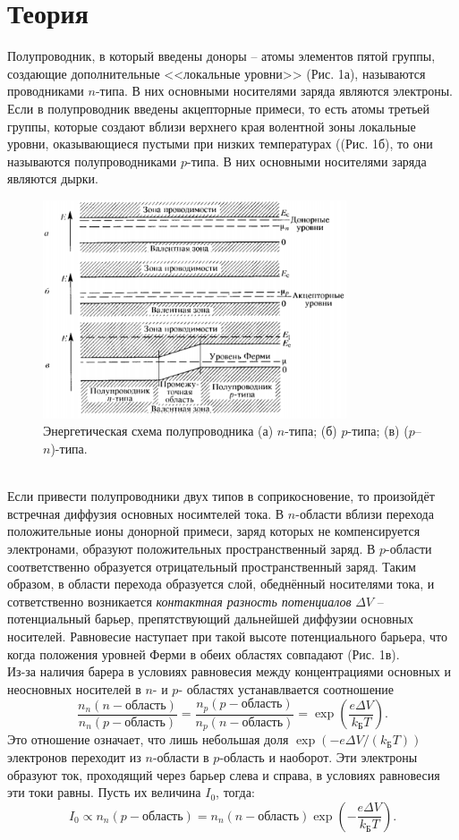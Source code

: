 \documentclass[a4paper,12pt]{article}
\theoremstyle{definition}
\begin{document}
\section*{Теория}
Полупроводник, в который введены доноры -- атомы элементов пятой группы, создающие дополнительные <<локальные уровни>> (Рис. 1а), называются проводниками $n$-типа. В них основными носителями заряда являются электроны. Если в полупроводник введены акцепторные примеси, то есть атомы третьей группы, которые создают вблизи верхнего края волентной зоны локальные уровни, оказывающиеся пустыми при низких температурах ((Рис. 1б), то они называются полупроводниками $p$-типа. В них основными носителями заряда являются дырки.
\begin{figure}[h]
\includegraphics[width = 0.8\textwidth]{1.png}
\centering
\caption{Энергетическая схема полупроводника (а) $n$-типа; (б) $p$-типа; (в) ($p$--$n$)-типа.}
\end{figure}\\
Если привести полупроводники двух типов в соприкосновение, то произойдёт встречная диффузия основных носимтелей тока. В $n$-области вблизи перехода положительные ионы донорной примеси, заряд которых не компенсируется электронами, образуют положительных пространственный заряд. В $p$-области соответственно образуется отрицательный пространственный заряд. Таким образом, в области перехода образуется слой, обеднённый носителями тока, и сответственно возникается \textit{контактная разность потенциалов} $\Delta V$ -- потенциальный барьер, препятствующий дальнейшей диффузии основных носителей. Равновесие наступает при такой высоте потенциального барьера, что когда положения уровней Ферми в обеих областях совпадают (Рис. 1в).\\
Из-за наличия барера в условиях равновесия между концентрациями основных и неосновных носителей в $n$- и $p$- областях устанавлвается соотношение 
\[\dfrac{n_n(n-\text{область})}{n_n(p-\text{область})} = \dfrac{n_p(p-\text{область})}{n_p(n-\text{область})} = \exp\left( \dfrac{e\Delta V}{k_\text{Б}T}\right).\]
Это отношение означает, что лишь небольшая доля $\exp(-e\Delta V/(k_\text{Б}T))$ электронов переходит из $n$-области в $p$-область и наоборот. Эти электроны образуют ток, проходящий через барьер слева и справа, в условиях равновесия эти токи равны. Пусть их величина $I_0$, тогда:
\begin{equation}\label{1}
I_0 \propto n_n(p-\text{область}) = n_n(n-\text{область}) \exp\left(- \dfrac{e\Delta V}{k_\text{Б}T} \right).
\end{equation}
\end{document}
